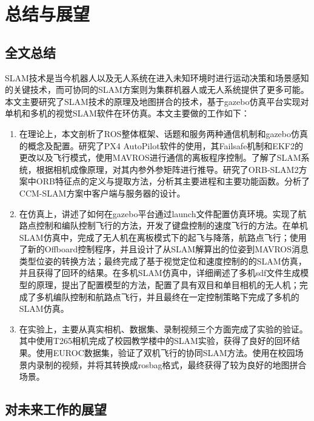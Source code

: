 
\renewcommand{\baselinestretch}{1.5}
\fontsize{12pt}{13pt}\selectfont

\chapter{总结与展望} \label{conclusion}


\section{全文总结}

SLAM技术是当今机器人以及无人系统在进入未知环境时进行运动决策和场景感知的关键技术，而可协同的SLAM方案则为集群机器人或无人系统提供了更多可能。本文主要研究了SLAM技术的原理及地图拼合的技术，基于gazebo仿真平台实现对单机和多机的视觉SLAM软件在环仿真。本文主要做的工作如下：

\begin{enumerate}
	\item 在理论上，本文剖析了ROS整体框架、话题和服务两种通信机制和gazebo仿真的概念及配置。研究了PX4 AutoPilot软件的使用，其Failsafe机制和EKF2的更改以及飞行模式，使用MAVROS进行通信的离板程序控制。了解了SLAM系统，根据相机成像原理，对其内参外参矩阵进行推导。研究了ORB-SLAM2方案中ORB特征点的定义与提取方法，分析其主要进程和主要功能函数。分析了CCM-SLAM方案中客户端与服务器的设计。
	
	\item 在仿真上，讲述了如何在gazebo平台通过launch文件配置仿真环境。实现了航路点控制和编队控制飞行的方法，开发了键盘控制的速度飞行的方法。在单机SLAM仿真中，完成了无人机在离板模式下的起飞与降落，航路点飞行；使用了新的Offboard控制程序，并且设计了从SLAM解算出的位姿到MAVROS消息类型位姿的转换方法；最终完成了基于视觉定位和速度控制的的SLAM仿真，并且获得了回环的结果。在多机SLAM仿真中，详细阐述了多机sdf文件生成模型的原理，提出了配置模型的方法，配置了具有双目和单目相机的无人机；完成了多机编队控制和航路点飞行，并且最终在一定控制策略下完成了多机的SLAM仿真。
	
	\item 在实验上，主要从真实相机、数据集、录制视频三个方面完成了实验的验证。其中使用T265相机完成了校园教学楼中的SLAM实验，获得了良好的回环结果。使用EUROC数据集，验证了双机飞行的协同SLAM方法。使用在校园场景内录制的视频，并将其转换成rosbag格式，最终获得了较为良好的地图拼合场景。
\end{enumerate}

\section{对未来工作的展望}

